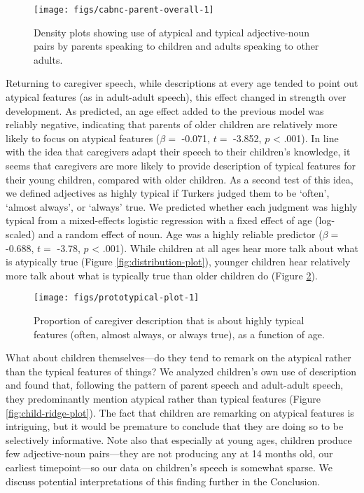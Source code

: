 \documentclass{ucetd}
\begin{document}
\begin{figure}[tb]

{\centering \texttt{[image: figs/cabnc-parent-overall-1]} 

}

\caption{Density plots showing use of atypical and typical adjective-noun pairs by parents speaking to children and adults speaking to other adults.}\label{fig:cabnc-parent-overall}
\end{figure}

Returning to caregiver speech, while descriptions at every age tended to
point out atypical features (as in adult-adult speech), this effect
changed in strength over development. As predicted, an age effect added
to the previous model was reliably negative, indicating that parents of
older children are relatively more likely to focus on atypical features
(\(\beta =\) -0.071, \(t =\) -3.852, \(p\) \textless{} .001). In line
with the idea that caregivers adapt their speech to their children's
knowledge, it seems that caregivers are more likely to provide
description of typical features for their young children, compared with
older children. As a second test of this idea, we defined adjectives as
highly typical if Turkers judged them to be `often', `almost always', or
`always' true. We predicted whether each judgment was highly typical
from a mixed-effects logistic regression with a fixed effect of age
(log-scaled) and a random effect of noun. Age was a highly reliable
predictor (\(\beta =\) -0.688, \(t =\) -3.78, \(p\) \textless{} .001).
While children at all ages hear more talk about what is atypically true
(Figure \ref{fig:distribution-plot}), younger children hear relatively
more talk about what is typically true than older children do (Figure
\ref{fig:prototypical-plot}).

\begin{figure}[!tb]

{\centering \texttt{[image: figs/prototypical-plot-1]} 

}

\caption{Proportion of caregiver description that is about highly typical features (often, almost always, or always true), as a function of age.}\label{fig:prototypical-plot}
\end{figure}

What about children themselves---do they tend to remark on the atypical
rather than the typical features of things? We analyzed children's own
use of description and found that, following the pattern of parent
speech and adult-adult speech, they predominantly mention atypical
rather than typical features (Figure \ref{fig:child-ridge-plot}). The
fact that children are remarking on atypical features is intriguing, but
it would be premature to conclude that they are doing so to be
selectively informative. Note also that especially at young ages,
children produce few adjective-noun pairs---they are not producing any
at 14 months old, our earliest timepoint---so our data on children's
speech is somewhat sparse. We discuss potential interpretations of this
finding further in the Conclusion.
\end{document}
